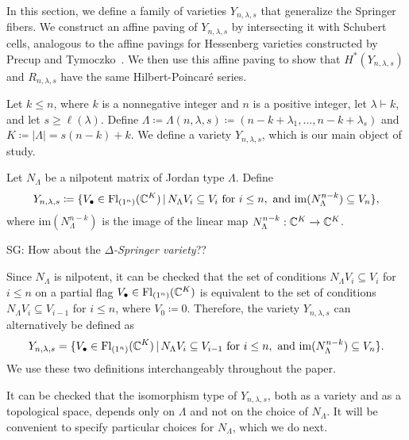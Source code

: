 \documentclass[12pt]{amsart}
\newcommand{\st}{\,|\,}
\newcommand{\Fl}{\mathrm{Fl}}
\newcommand{\la}{\lambda}
\newcommand{\im}{\mathrm{im}}
\newcommand{\SG}[1]{{\color{red} SG: #1}}
\begin{document}
In this section, we define a family of varieties $Y_{n,\lambda,s}$ that generalize the Springer fibers. We construct an affine paving of $Y_{n,\lambda,s}$ by intersecting it with Schubert cells, analogous to the affine pavings for Hessenberg varieties constructed by Precup and Tymoczko~\cite{Precup-AffinePavings,Precup-Tymoczko-Parabolic,Tymoczko-LinearConditions}. We then use this affine paving to show that $H^*(Y_{n,\lambda,s})$ and $R_{n,\lambda,s}$ have the same Hilbert-Poincar\'e series.

Let $k\leq n$, where $k$ is a nonnegative integer and $n$ is a positive integer, let $\la\vdash k$, and let $s\geq \ell(\la)$. Define $\Lambda \coloneqq \Lambda(n,\lambda,s) \coloneqq (n-k+\lambda_1,\ldots,n-k+\lambda_s)$ and $K\coloneqq |\Lambda|=s(n-k)+k$. We define a variety $Y_{n,\la,s}$, which is our main object of study.
\begin{definition}
Let $N_\Lambda$ be a nilpotent matrix of Jordan type $\Lambda$. Define
\begin{align}
    Y_{n,\la,s}\coloneqq \{V_\bullet \in \Fl_{(1^n)}(\bC^K)\st N_\Lambda V_i\subseteq V_i\text{ for }i\leq n,\text{ and }\im(N_\Lambda^{n-k})\subseteq V_n\},
\end{align}
where $\im(N_\Lambda^{n-k})$ is the image of the linear map $N_\Lambda^{n-k}: \mathbb{C}^K\to \mathbb{C}^K$.
\end{definition}

\SG{How about the \emph{$\Delta$-Springer variety}??}

\begin{remark}
Since $N_\Lambda$ is nilpotent, it can be checked that the set of conditions $N_\Lambda V_i\subseteq V_i$ for $i\leq n$ on a partial flag $V_\bullet\in \Fl_{(1^n)}(\bC^K)$ is equivalent to the set of conditions $N_\Lambda V_i\subseteq V_{i-1}$ for $i\leq n$, where $V_0\coloneqq 0$. Therefore, the variety $Y_{n,\la,s}$ can alternatively be defined as
\begin{align}
    Y_{n,\la,s} = \{V_\bullet \in \Fl_{(1^n)}(\bC^K) \st N_\Lambda V_i\subseteq V_{i-1} \text{ for }i\leq n,\text{ and }\im(N_\Lambda^{n-k})\subseteq V_n\}.
\end{align}
We use these two definitions interchangeably throughout the paper.
\end{remark}
It can be checked that the isomorphism type of $Y_{n,\la,s}$, both as a variety and as a topological space, depends only on $\Lambda$ and not on the choice of $N_\Lambda$. It will be convenient to specify particular choices for $N_\Lambda$, which we do next. 
\end{document}
